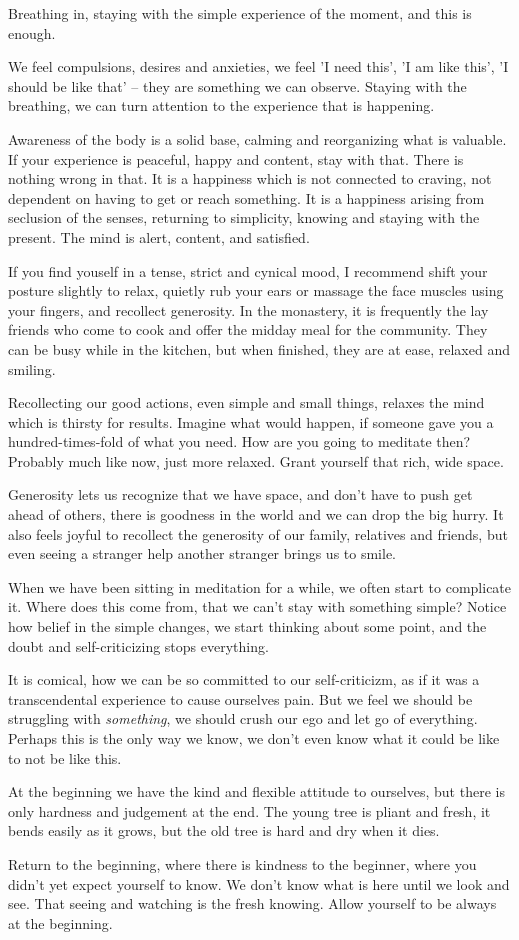 Breathing in, staying with the simple experience of the moment, and this
is enough.

We feel compulsions, desires and anxieties, we feel 'I need this', 'I am
like this', 'I should be like that' -- they are something we can
observe. Staying with the breathing, we can turn attention to the
experience that is happening.

Awareness of the body is a solid base, calming and reorganizing what is
valuable. If your experience is peaceful, happy and content, stay with
that. There is nothing wrong in that. It is a happiness which is not
connected to craving, not dependent on having to get or reach something.
It is a happiness arising from seclusion of the senses, returning to
simplicity, knowing and staying with the present. The mind is alert,
content, and satisfied.

If you find youself in a tense, strict and cynical mood, I recommend
shift your posture slightly to relax, quietly rub your ears or massage
the face muscles using your fingers, and recollect generosity. In the
monastery, it is frequently the lay friends who come to cook and offer
the midday meal for the community. They can be busy while in the
kitchen, but when finished, they are at ease, relaxed and smiling.

Recollecting our good actions, even simple and small things, relaxes the
mind which is thirsty for results. Imagine what would happen, if someone
gave you a hundred-times-fold of what you need. How are you going to
meditate then? Probably much like now, just more relaxed. Grant yourself
that rich, wide space.

Generosity lets us recognize that we have space, and don't have to push
get ahead of others, there is goodness in the world and we can drop the
big hurry. It also feels joyful to recollect the generosity of our
family, relatives and friends, but even seeing a stranger help another
stranger brings us to smile.

When we have been sitting in meditation for a while, we often start to
complicate it. Where does this come from, that we can't stay with
something simple? Notice how belief in the simple changes, we start
thinking about some point, and the doubt and self-criticizing stops
everything.

It is comical, how we can be so committed to our self-criticizm, as if
it was a transcendental experience to cause ourselves pain. But we feel
we should be struggling with \emph{something}, we should crush our ego
and let go of everything. Perhaps this is the only way we know, we don't
even know what it could be like to not be like this.

At the beginning we have the kind and flexible attitude to ourselves,
but there is only hardness and judgement at the end. The young tree is
pliant and fresh, it bends easily as it grows, but the old tree is hard
and dry when it dies.

Return to the beginning, where there is kindness to the beginner, where
you didn't yet expect yourself to know. We don't know what is here until
we look and see. That seeing and watching is the fresh knowing. Allow
yourself to be always at the beginning.
